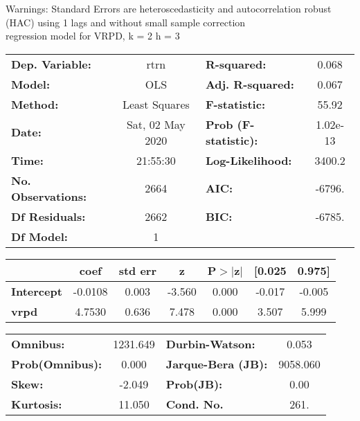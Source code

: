 Warnings: \newline
 [1] Standard Errors are heteroscedasticity and autocorrelation robust (HAC) using 1 lags and without small sample correction\\ 

regression model for VRPD, k = 2 h = 3\begin{center}
\begin{tabular}{lclc}
\toprule
\textbf{Dep. Variable:}    &       rtrn       & \textbf{  R-squared:         } &     0.068   \\
\textbf{Model:}            &       OLS        & \textbf{  Adj. R-squared:    } &     0.067   \\
\textbf{Method:}           &  Least Squares   & \textbf{  F-statistic:       } &     55.92   \\
\textbf{Date:}             & Sat, 02 May 2020 & \textbf{  Prob (F-statistic):} &  1.02e-13   \\
\textbf{Time:}             &     21:55:30     & \textbf{  Log-Likelihood:    } &    3400.2   \\
\textbf{No. Observations:} &        2664      & \textbf{  AIC:               } &    -6796.   \\
\textbf{Df Residuals:}     &        2662      & \textbf{  BIC:               } &    -6785.   \\
\textbf{Df Model:}         &           1      & \textbf{                     } &             \\
\bottomrule
\end{tabular}
\begin{tabular}{lcccccc}
                   & \textbf{coef} & \textbf{std err} & \textbf{z} & \textbf{P$> |$z$|$} & \textbf{[0.025} & \textbf{0.975]}  \\
\midrule
\textbf{Intercept} &      -0.0108  &        0.003     &    -3.560  &         0.000        &       -0.017    &       -0.005     \\
\textbf{vrpd}      &       4.7530  &        0.636     &     7.478  &         0.000        &        3.507    &        5.999     \\
\bottomrule
\end{tabular}
\begin{tabular}{lclc}
\textbf{Omnibus:}       & 1231.649 & \textbf{  Durbin-Watson:     } &    0.053  \\
\textbf{Prob(Omnibus):} &   0.000  & \textbf{  Jarque-Bera (JB):  } & 9058.060  \\
\textbf{Skew:}          &  -2.049  & \textbf{  Prob(JB):          } &     0.00  \\
\textbf{Kurtosis:}      &  11.050  & \textbf{  Cond. No.          } &     261.  \\
\bottomrule
\end{tabular}
\end{center}

